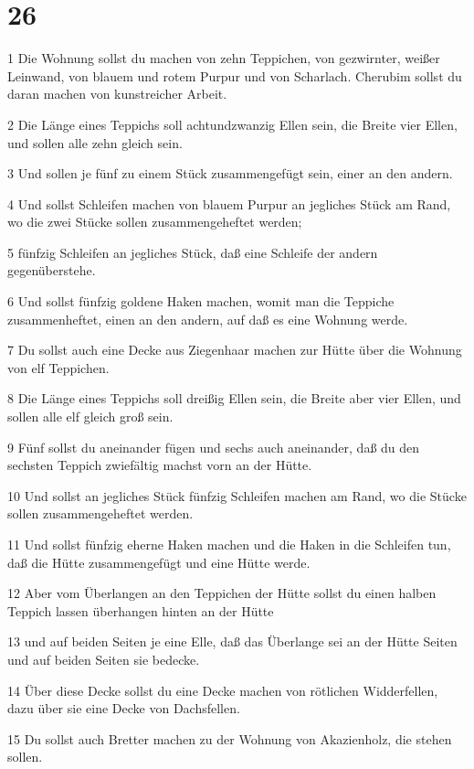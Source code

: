 \chapter{26}

\par 1 Die Wohnung sollst du machen von zehn Teppichen, von gezwirnter, weißer Leinwand, von blauem und rotem Purpur und von Scharlach. Cherubim sollst du daran machen von kunstreicher Arbeit.
\par 2 Die Länge eines Teppichs soll achtundzwanzig Ellen sein, die Breite vier Ellen, und sollen alle zehn gleich sein.
\par 3 Und sollen je fünf zu einem Stück zusammengefügt sein, einer an den andern.
\par 4 Und sollst Schleifen machen von blauem Purpur an jegliches Stück am Rand, wo die zwei Stücke sollen zusammengeheftet werden;
\par 5 fünfzig Schleifen an jegliches Stück, daß eine Schleife der andern gegenüberstehe.
\par 6 Und sollst fünfzig goldene Haken machen, womit man die Teppiche zusammenheftet, einen an den andern, auf daß es eine Wohnung werde.
\par 7 Du sollst auch eine Decke aus Ziegenhaar machen zur Hütte über die Wohnung von elf Teppichen.
\par 8 Die Länge eines Teppichs soll dreißig Ellen sein, die Breite aber vier Ellen, und sollen alle elf gleich groß sein.
\par 9 Fünf sollst du aneinander fügen und sechs auch aneinander, daß du den sechsten Teppich zwiefältig machst vorn an der Hütte.
\par 10 Und sollst an jegliches Stück fünfzig Schleifen machen am Rand, wo die Stücke sollen zusammengeheftet werden.
\par 11 Und sollst fünfzig eherne Haken machen und die Haken in die Schleifen tun, daß die Hütte zusammengefügt und eine Hütte werde.
\par 12 Aber vom Überlangen an den Teppichen der Hütte sollst du einen halben Teppich lassen überhangen hinten an der Hütte
\par 13 und auf beiden Seiten je eine Elle, daß das Überlange sei an der Hütte Seiten und auf beiden Seiten sie bedecke.
\par 14 Über diese Decke sollst du eine Decke machen von rötlichen Widderfellen, dazu über sie eine Decke von Dachsfellen.
\par 15 Du sollst auch Bretter machen zu der Wohnung von Akazienholz, die stehen sollen.

